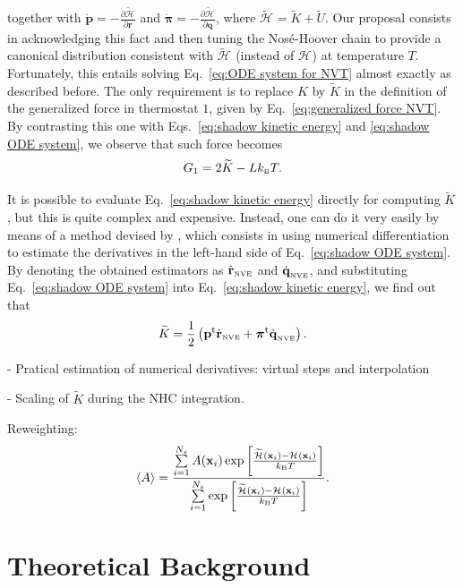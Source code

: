 \documentclass[journal=jctcce,manuscript=article,layout=twocolumn]{achemso}
\newcommand{\vt}[1]{\boldsymbol{\mathbf{#1}}}   %
\newcommand{\tr}[1]{#1^\text{t}}                %
\newcommand{\diff}[2]{\frac{\partial #1}{\partial #2}} %
\newcommand{\Ham}[1]{{\mathcal H}_\text{#1}}    %
\newcommand{\modified}[1]{\widetilde{#1}}
\begin{document}
together with $\dot{\vt p} = -\diff{\modified{\Ham{}}}{\vt r}$ and $\dot{\vt \pi} = -\diff{\modified{\Ham{}}}{\vt q}$, where $\modified{\Ham{}} = \modified K + \modified U$. Our proposal consists in acknowledging this fact and then tuning the Nos\'e-Hoover chain to provide a canonical distribution consistent with $\modified{\Ham{}}$ (instead of $\Ham{}$) at temperature $T$. Fortunately, this entails solving Eq.~\eqref{eq:ODE system for NVT} almost exactly as described before. The only requirement is to replace $K$ by $\modified K$ in the definition of the generalized force in thermostat $1$, given by Eq.~\eqref{eq:generalized force NVT}. By contrasting this one with Eqs.~\eqref{eq:shadow kinetic energy} and \eqref{eq:shadow ODE system}, we observe that such force becomes
\begin{equation}
G_1 = 2 \modified K - L k_\text{\tiny B} T.
\end{equation}

It is possible to evaluate Eq.~\eqref{eq:shadow kinetic energy} directly for computing $\modified K$, but this is quite complex and expensive. Instead, one can do it very easily by means of a method devised by \citeauthor{Eastwood_2010} \cite{Eastwood_2010}, which consists in using numerical differentiation to estimate the derivatives in the left-hand side of Eq.~\eqref{eq:shadow ODE system}. By denoting the obtained estimators as $\dot{\vt r}_\text{\tiny NVE}$ and $\dot{\vt q}_\text{\tiny NVE}$, and substituting Eq.~\eqref{eq:shadow ODE system} into Eq.~\eqref{eq:shadow kinetic energy}, we find out that
\begin{equation}
\modified K = \frac{1}{2} \left( \tr{\vt p} \dot{\vt r}_\text{\tiny NVE} + \tr{\vt \pi} \dot{\vt q}_\text{\tiny NVE} \right).
\end{equation}

- Pratical estimation of numerical derivatives: virtual steps and interpolation


- Scaling of $\modified K$ during the NHC integration.

Reweighting:
\begin{equation}
\label{eq:reweighting}
\langle A \rangle = \frac{\sum\limits_{i=1}^{N_s} A(\vt x_i) \exp \left[{\frac{\modified{\Ham{}}(\vt x_i) - {\Ham{}}(\vt x_i)}{k_\text{\tiny B} T}}\right]}{\sum\limits_{i=1}^{N_s} \exp \left[{\frac{\modified{\Ham{}}(\vt x_i) - {\Ham{}}(\vt x_i)}{k_\text{\tiny B} T}}\right] }.
\end{equation}

\section{Theoretical Background}
\label{sec:theory}
\end{document}
